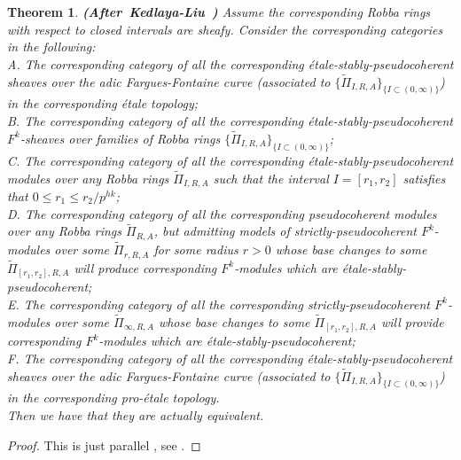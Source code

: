 \documentclass[12pt]{amsart}
\newtheorem{theorem}{Theorem}[section]
\theoremstyle{definition}
\numberwithin{equation}{section}
\begin{document}
\begin{theorem}\mbox{\bf{(After Kedlaya-Liu \cite[Theorem 4.6.1]{KL2})}}
Assume the corresponding Robba rings with respect to closed intervals are sheafy. Consider the corresponding categories in the following:\\
A. The corresponding category of all the corresponding \'etale-stably-pseudocoherent sheaves over the adic Fargues-Fontaine curve (associated to $\{\widetilde{\Pi}_{I,R,A}\}_{\{I\subset (0,\infty)\}}$) in the corresponding \'etale topology;\\
B. The corresponding category of all the corresponding \'etale-stably-pseudocoherent $F^k$-sheaves over families of Robba rings $\{\widetilde{\Pi}_{I,R,A}\}_{\{I\subset (0,\infty)\}}$;\\
C. The corresponding category of all the corresponding \'etale-stably-pseudocoherent modules over any Robba rings $\widetilde{\Pi}_{I,R,A}$ such that the interval $I=[r_1,r_2]$ satisfies that $0\leq r_1 \leq r_2/p^{hk}$;\\
D. The corresponding category of all the corresponding pseudocoherent modules over any Robba rings $\widetilde{\Pi}_{R,A}$, but admitting models of strictly-pseudocoherent $F^k$-modules over some $\widetilde{\Pi}_{r,R,A}$ for some radius $r>0$ whose base changes to some $\widetilde{\Pi}_{[r_1,r_2],R,A}$ will produce corresponding $F^k$-modules which are \'etale-stably-pseudocoherent;\\
E. The corresponding category of all the corresponding strictly-pseudocoherent $F^k$-modules over some $\widetilde{\Pi}_{\infty,R,A}$ whose base changes to some $\widetilde{\Pi}_{[r_1,r_2],R,A}$ will provide corresponding $F^k$-modules which are \'etale-stably-pseudocoherent;\\
F. The corresponding category of all the corresponding \'etale-stably-pseudocoherent sheaves over the adic Fargues-Fontaine curve (associated to $\{\widetilde{\Pi}_{I,R,A}\}_{\{I\subset (0,\infty)\}}$) in the corresponding pro-\'etale topology.\\
Then we have that they are actually equivalent.


\end{theorem}



\begin{proof}
This is just parallel \cite[Theorem 4.6.1]{KL2}, see \cite[Theorem 4.11]{XT2}.	
\end{proof}
\end{document}
